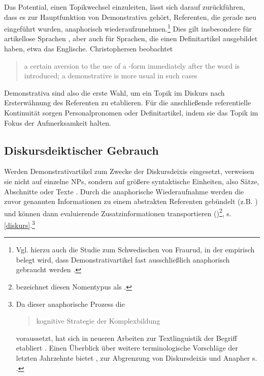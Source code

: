 \begin{exe}
	\ex \label{ex:topic}  
\end{exe}

Das Potential, einen Topikwechsel einzuleiten, lässt sich darauf zurückführen, dass es zur Hauptfunktion von Demonstrativa gehört, Referenten, die gerade neu eingeführt wurden, anaphorisch wiederaufzunehmen.\footnote{Vgl. hierzu auch die Studie zum Schwedischen von Fraurud, in der empirisch belegt wird, dass Demonstrativartikel fast ausschließlich anaphorisch gebraucht werden \parencite[400]{Fraurud1990}.} Dies gilt insbesondere für artikellose Sprachen  \parencite[229]{Himmelmann1996}, aber auch für Sprachen, die einen Definitartikel ausgebildet haben, etwa das Englische. Christophersen beobachtet \blockcquote[vgl.][29]{Christophersen1939} {a certain aversion to the use of a -form immediately after the word is introduced; a demonstrative is more usual in such cases}. Demonstrativa sind also die erste Wahl, um ein Topik im Diskurs nach Ersterwähnung des Referenten zu etablieren. Für die  anschließende referentielle Kontinuität sorgen  Personalpronomen oder Definitartikel, indem sie das Topik im Fokus der Aufmerksamkeit halten. 

\subsection{Diskursdeiktischer Gebrauch}\label{diskurs-deikt}

Werden Demonstrativartikel zum Zwecke der Diskursdeixis eingesetzt, verweisen sie nicht auf einzelne NPs, sondern auf größere syntaktische Einheiten, also Sätze, Abschnitte oder Texte \parencite{Webber1991,Fraurud1992, Fillmore1997, Diessel1999, Consten2007, Consten2009, Marx2011}. Durch die anaphorische Wiederaufnahme werden die zuvor genannten Informationen zu einem abstrakten Referenten gebündelt (z.B. ) und können dann evaluierende Zusatzinformationen transportieren ()\footnote{\textcite{Schmid2000} bezeichnet diesen Nomentypus als  .},  s.\ref{diskurs}.\footnote{Da dieser anaphorische Prozess die \blockcquote[129]{Schwarz2000}{kognitive Strategie der Komplexbildung} voraussetzt, hat sich in neueren Arbeiten zur Textlinguistik der Begriff  etabliert \parencite[s. z.b.][]{Consten2007, Consten2009}. Einen Überblick über weitere terminologische Vorschläge der letzten Jahrzehnte bietet \textcite[16f.]{Marx2011}, zur Abgrenzung von Diskursdeixis und Anapher s. \textcite[30f.]{Consten2004}.} 


